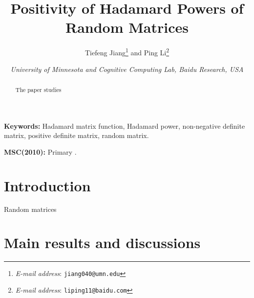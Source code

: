 \documentclass[conference,letterpaper]{IEEEtran}
\numberwithin{equation}{section}
\newcommand{\lbl}{\label}
\begin{document}
\title{Positivity of Hadamard Powers of Random Matrices}
\author{Tiefeng Jiang\thanks{ \textsl{E-mail address}:
\texttt{jiang040@umn.edu}} and  Ping Li\thanks{ \textsl{E-mail address}:
\texttt{liping11@baidu.com}} }
\date{\small \it University of Minnesota and Cognitive Computing Lab, Baidu Research, USA}
\maketitle
\begin{abstract}
\noindent The paper studies
\end{abstract}



\noindent\textbf{Keywords:} Hadamard matrix function, Hadamard power, non-negative definite matrix, positive definite matrix, random matrix.

\medskip

\noindent\textbf{MSC(2010):} Primary .\\
[0.5cm]


\section{Introduction}
Random matrices 


\section{Main results and discussions}\lbl{Section_horse}
\end{document}
